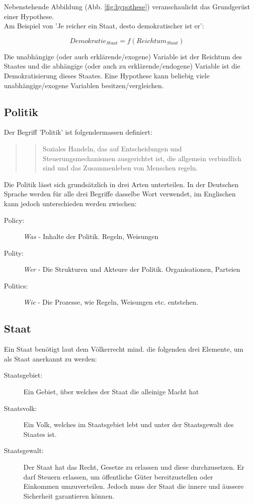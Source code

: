 \documentclass[a4paper, 11pt]{article}
\begin{document}
Nebenstehende Abbildung (Abb. \ref{fig:hypothese}) veranschaulicht das Grundgerüst einer Hypothese. \\
Am Beispiel von 'Je reicher ein Staat, desto demokratischer ist er':

\begin{equation}
Demokratie_{Staat} = f(Reichtum_{Staat})
\end{equation}

Die unabhängige (oder auch erklärende/exogene) Variable ist der Reichtum des Staates und die abhängige (oder auch zu erklärende/endogene) Variable ist die Demokratisierung dieses Staates. Eine Hypothese kann beliebig viele unabhängige/exogene Variablen besitzen/vergleichen.



\subsection{Politik}
Der Begriff 'Politik' ist folgendermassen definiert:

\begin{quote}
	\centering
    \blockquote{Soziales Handeln, das auf Entscheidungen und Steuerungsmechanismen ausgerichtet ist, die allgemein verbindlich sind und das Zusammenleben von Menschen regeln.}
\end{quote}

Die Politik lässt sich grundsätzlich in drei Arten unterteilen. In der Deutschen Sprache werden für alle drei Begriffe dasselbe Wort verwendet, im Englischen kann jedoch unterschieden werden zwischen: 
\begin{description}
    \item[Policy: ] \textit{Was} - Inhalte der Politik. Regeln, Weisungen
    \item[Polity:] \textit{Wer} - Die Strukturen und Akteure der Politik.  Organisationen, Parteien 
    \item[Politics:]  \textit{Wie} - Die Prozesse, wie Regeln, Weisungen etc. entstehen.
\end{description}

\subsection{Staat}
Ein Staat benötigt laut dem Völkerrecht mind. die folgenden drei Elemente, um als Staat anerkannt zu werden: 
\begin{description}
    \item[Staatsgebiet: ] Ein Gebiet, über welches der Staat die alleinige Macht hat
    \item[Staatsvolk: ] Ein Volk, welches im Staatsgebiet lebt und unter der Staatsgewalt des Staates ist.
    \item[Staatsgewalt: ] Der Staat hat das Recht, Gesetze zu erlassen und diese durchzusetzen. Er darf Steuern erlassen, um öffentliche Güter bereitzustellen oder Einkommen umzuverteilen. Jedoch muss der Staat die innere und äussere Sicherheit garantieren können.
\end{description}
\end{document}
